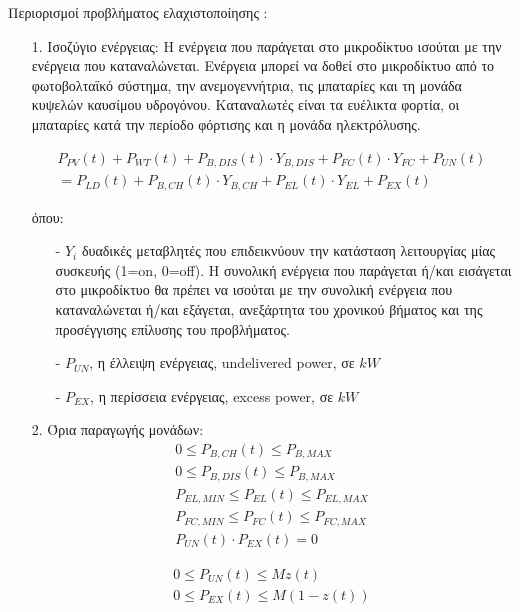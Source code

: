 Περιορισμοί προβλήματος ελαχιστοποίησης \cite{CAU2014820}:
\begin{itemize}
\item[1.] Ισοζύγιο ενέργειας:
Η ενέργεια που παράγεται στο μικροδίκτυο ισούται με την ενέργεια που καταναλώνεται. Ενέργεια μπορεί να δοθεί στο μικροδίκτυο από το φωτοβολταϊκό σύστημα, την ανεμογεννήτρια, τις μπαταρίες και τη μονάδα κυψελών καυσίμου υδρογόνου. Καταναλωτές είναι τα ευέλικτα φορτία, οι μπαταρίες κατά την περίοδο φόρτισης και η μονάδα ηλεκτρόλυσης. 

\begin{equation}
    \begin{split}
    P_{PV}(t) + P_{WT}(t) + P_{B,DIS}(t) \cdot Y_{B,DIS} + P_{FC}(t)
\cdot Y_{FC} + P_{UN}(t) \\
    = P_{LD}(t) + P_{B,CH}(t) \cdot Y_{B,CH} + P_{EL}(t) \cdot Y_{EL} + P_{EX}(t)  
    \end{split}
\end{equation}
        
όπου:
\begin{itemize}
    \item[-] $Y_i$ δυαδικές μεταβλητές που επιδεικνύουν την κατάσταση λειτουργίας μίας συσκευής (1=on, 0=off). Η συνολική ενέργεια που παράγεται ή/και εισάγεται στο μικροδίκτυο θα πρέπει να ισούται με την συνολική ενέργεια που καταναλώνεται ή/και εξάγεται, ανεξάρτητα του χρονικού βήματος και της προσέγγισης επίλυσης του προβλήματος. 
    \item[-] $P_{UN}$, η έλλειψη ενέργειας, undelivered power, σε $kW$
    \item[-] $P_{EX}$, η περίσσεια ενέργειας, excess power, σε $kW$
\end{itemize}

\item[2.] Όρια παραγωγής μονάδων:
\begin{align}
    0 \leq P_{B,CH}(t) \leq P_{B,MAX} \\
    0 \leq P_{B,DIS}(t) \leq P_{B,MAX} \\
    P_{EL,MIN} \leq P_{EL}(t) \leq P_{EL,MAX} \\
    P_{FC,MIN} \leq P_{FC}(t) \leq P_{FC,MAX} \\
    P_{UN}(t) \cdot P_{EX}(t) = 0 
\end{align}

\begin{align}
    0 \leq P_{UN}(t) \leq Mz(t) \\
    0 \leq P_{EX}(t) \leq M(1-z(t))   
\end{align}


\end{itemize}
